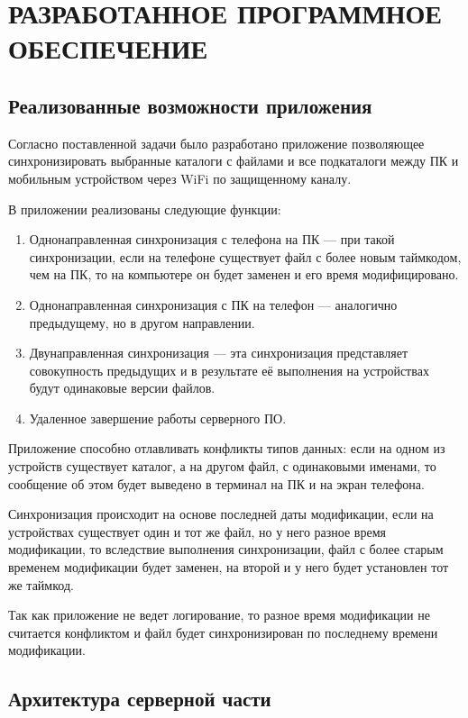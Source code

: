 

\section{РАЗРАБОТАННОЕ ПРОГРАММНОЕ ОБЕСПЕЧЕНИЕ}

\subsection{Реализованные возможности приложения}

Согласно поставленной задачи было разработано приложение позволяющее синхронизировать выбранные каталоги с файлами и все подкаталоги между ПК и мобильным устройством через WiFi по защищенному каналу. 

В приложении реализованы следующие функции: 
\begin{enumerate}
	\item Однонаправленная синхронизация с телефона на ПК --- при такой синхронизации, если на телефоне существует файл с более новым таймкодом, чем на ПК, то на компьютере он будет заменен и его время модифицировано.
	\item Однонаправленная синхронизация с ПК на телефон --- аналогично предыдущему, но в другом направлении.
	\item Двунаправленная синхронизация --- эта синхронизация представляет совокупность предыдущих и в результате её выполнения на устройствах будут одинаковые версии файлов.
	\item Удаленное завершение работы серверного ПО.
\end{enumerate}

Приложение способно отлавливать конфликты типов данных: если на одном из устройств существует каталог, а на другом файл, с одинаковыми именами, то сообщение об этом будет выведено в терминал на ПК и на экран телефона.

Синхронизация происходит на основе последней даты модификации, если на устройствах существует один и тот же файл, но у него разное время модификации, то вследствие выполнения синхронизации, файл с более старым временем модификации будет заменен, на второй и у него будет установлен тот же таймкод. 

Так как приложение не ведет логирование, то разное время модификации не считается конфликтом и файл будет синхронизирован по последнему времени модификации.

\subsection{Архитектура серверной части}

